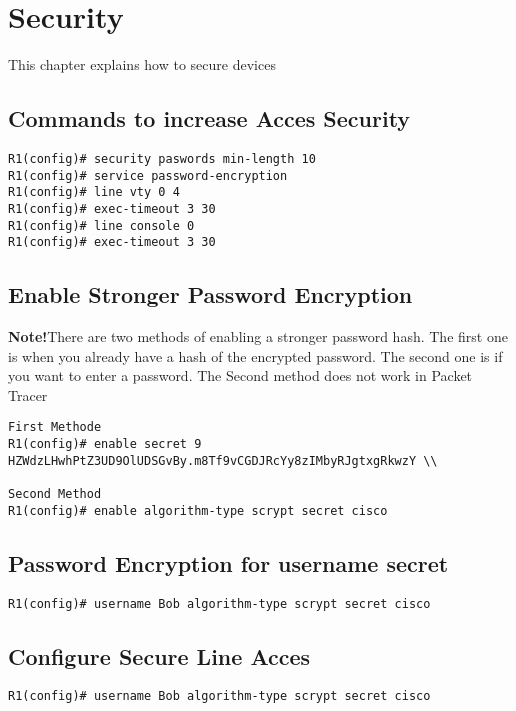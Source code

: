 \section{Security}
This chapter explains how to secure devices 
\subsection{Commands to increase Acces Security}
\begin{verbatim}
R1(config)# security paswords min-length 10 
R1(config)# service password-encryption
R1(config)# line vty 0 4 
R1(config)# exec-timeout 3 30
R1(config)# line console 0 
R1(config)# exec-timeout 3 30
\end{verbatim}

\subsection{Enable Stronger Password Encryption}
\begin{tcolorbox}
\textbf{Note!}There are two methods of enabling a stronger password hash. The first one is when you already have a hash of the encrypted password. The second one is if you want to enter a password. The Second method does not work in Packet Tracer
\end{tcolorbox}
\begin{verbatim}
First Methode
R1(config)# enable secret 9 HZWdzLHwhPtZ3UD9OlUDSGvBy.m8Tf9vCGDJRcYy8zIMbyRJgtxgRkwzY \\

Second Method
R1(config)# enable algorithm-type scrypt secret cisco 
\end{verbatim}

\subsection{Password Encryption for username secret}
\begin{verbatim}
R1(config)# username Bob algorithm-type scrypt secret cisco
\end{verbatim}


\subsection{Configure Secure Line Acces}
\begin{verbatim}
R1(config)# username Bob algorithm-type scrypt secret cisco
\end{verbatim}


